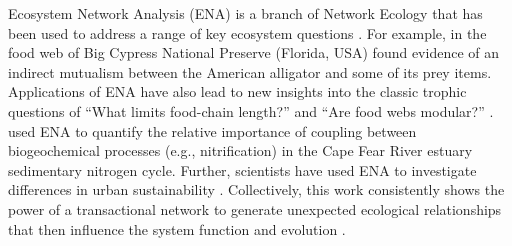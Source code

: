 \documentclass[11pt]{article}
\begin{document}
\begin{spacing}{2}

Ecosystem Network Analysis (ENA) is a branch of Network Ecology that
has been used to address a range of key ecosystem questions
\citep{borrett12_netecol, fath99_review, ulanowicz86}.
For example, in the food web of Big Cypress National Preserve
(Florida, USA) \citet{bondavalli99} found evidence of an indirect
mutualism between the American alligator and some of its prey
items. Applications of ENA have also lead to new insights into the
classic trophic questions of ``What limits food-chain length?''
\citep{ulanowicz2014} and ``Are food webs modular?''  \citep{krause04,
  allesina05_scc, borrett07_jtb}.  \citet{hines12} used ENA to
quantify the relative importance of coupling between biogeochemical
processes (e.g., nitrification) in the Cape Fear River estuary
sedimentary nitrogen cycle.  Further, scientists have used ENA to
investigate differences in urban sustainability \citep{bodini02,
  zhang10_ecomod, chen12, bodini2012cities}.  Collectively, this work
consistently shows the power of a transactional network to generate
unexpected ecological relationships that then influence the system
function and evolution \citep{ulanowicz97, patten91,
  jorgensen07_newecology}.



\end{spacing}
\end{document}
